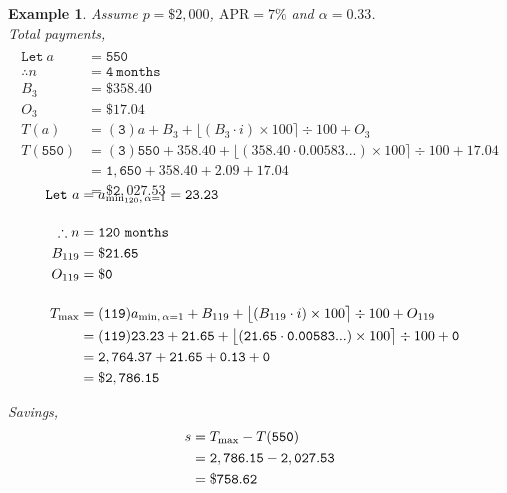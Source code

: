 \documentclass[12pt,letterpaper,oneside]{article}
\newtheorem{example}{Example}[section]
\theoremstyle{remark} %
\begin{document}
	\newpage
	\begin{example}
	Assume $p=\$2,000$, $\mbox{APR}=7\%$ and $\alpha=0.33$.\\[12pt]
	Total payments,
	\begin{align*}
	\\\mathtt{Let\ } a&=\mathtt{550}\\[12pt]
	\therefore n&=\mathtt{4\ months}\\
	B_{3}&=\mathtt{\$358.40}\\
	O_{3}&=\mathtt{\$17.04}\\[12pt]
	T(a)&=(\mathtt{3}) a+B_{3}+\big\lfloor{\left(B_{3}\cdot i\right)\times 100}\big\rceil\div 100+O_{3}\\
	T(\mathtt{550})&=(\mathtt{3}) \mathtt{550}+\mathtt{358.40}+\big\lfloor{\left(\mathtt{358.40}\cdot \mathtt{0.00583...}\right)\times 100}\big\rceil\div 100+\mathtt{17.04}\\
	&=\mathtt{1,650}+\mathtt{358.40}+\mathtt{2.09}+\mathtt{17.04}\\
	&=\mathtt{\$2,027.53}
	\end{align*}

	\label{amind}
	\begin{align*}\\[-36pt]
	\mathtt{Let\ } a&=a_{\rm{min_{120},\,\alpha=1}}=\mathtt{23.23}\\[12pt]
	\therefore n&=\mathtt{120\ months}\\
	B_{119}&=\mathtt{\$21.65}\\
	O_{119}&=\mathtt{\$0}\\[12pt]		
	T_{\rm{max}}&=(\mathtt{119}) a_{\rm{min},\,\alpha=1}+B_{119}+\big\lfloor{\left(B_{119}\cdot i\right)\times 100}\big\rceil\div 100+O_{119}\\
	&=(\mathtt{119}) \mathtt{23.23}+\mathtt{21.65}+\big\lfloor{\left(\mathtt{21.65}\cdot \mathtt{0.00583...}\right)\times 100}\big\rceil\div 100+\mathtt{0}\\
	&=\mathtt{2,764.37}+\mathtt{21.65}+\mathtt{0.13}+\mathtt{0}\\
	&=\mathtt{\$2,786.15}
	\end{align*}

	\vspace{12pt}
	Savings,
	\begin{align*}
	s&=T_{\rm{max}}-T(\mathtt{550})\\
	&=\mathtt{2,786.15}-\mathtt{2,027.53}\\
	&=\mathtt{\$758.62}
	\end{align*}
	

\end{example}
\end{document}

